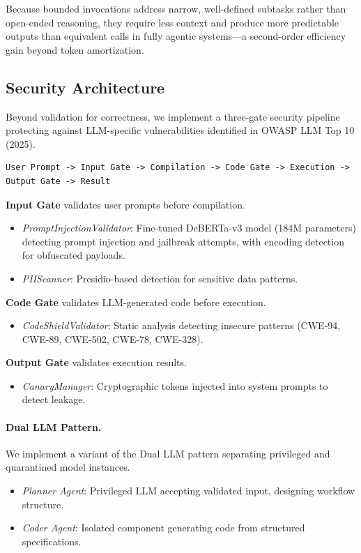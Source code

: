 \documentclass[11pt]{article}
\begin{document}
Because bounded invocations address narrow, well-defined subtasks rather than open-ended reasoning, they require less context and produce more predictable outputs than equivalent calls in fully agentic systems---a second-order efficiency gain beyond token amortization.

\subsection{Security Architecture}
\label{sec:security-arch}

Beyond validation for correctness, we implement a three-gate security pipeline protecting against LLM-specific vulnerabilities identified in OWASP LLM Top 10 (2025).

\begin{verbatim}
User Prompt -> Input Gate -> Compilation -> Code Gate -> Execution -> Output Gate -> Result
\end{verbatim}

\textbf{Input Gate} validates user prompts before compilation.
\begin{itemize}
    \item \textit{PromptInjectionValidator}: Fine-tuned DeBERTa-v3 model (184M parameters) detecting prompt injection and jailbreak attempts, with encoding detection for obfuscated payloads.
    \item \textit{PIIScanner}: Presidio-based detection for sensitive data patterns.
\end{itemize}

\textbf{Code Gate} validates LLM-generated code before execution.
\begin{itemize}
    \item \textit{CodeShieldValidator}: Static analysis detecting insecure patterns (CWE-94, CWE-89, CWE-502, CWE-78, CWE-328).
\end{itemize}

\textbf{Output Gate} validates execution results.
\begin{itemize}
    \item \textit{CanaryManager}: Cryptographic tokens injected into system prompts to detect leakage.
\end{itemize}

\paragraph{Dual LLM Pattern.} We implement a variant of the Dual LLM pattern separating privileged and quarantined model instances.
\begin{itemize}
    \item \textit{Planner Agent}: Privileged LLM accepting validated input, designing workflow structure.
    \item \textit{Coder Agent}: Isolated component generating code from structured specifications.
\end{itemize}
\end{document}
